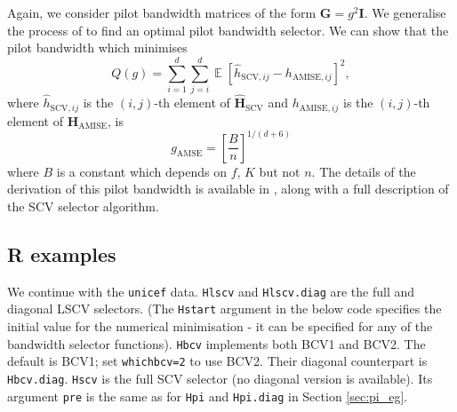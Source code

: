 \documentclass[a4paper,11pt]{article}
\newcommand{\mat}[1]{\mathbf{#1}}
\def\Hmat{\mat{H}}
\def\G{\mat{G}}
\def\AMSE{\mathrm{AMSE}}
\def\AMISE{\mathrm{AMISE}}
\def\SCV{\mathrm{SCV}}
\DeclareMathOperator{\E}{\boldsymbol{\mathbb{E}}}
\begin{document}
Again, we consider pilot bandwidth matrices of the form  $\G = g^2 \mat{I}$.
We generalise the process of \citet*{jones1991b} to find an optimal 
pilot bandwidth selector.
We can show that the pilot bandwidth which minimises 
$$Q(g) = \sum_{i=1}^d \sum_{j=i}^d \E [\hat{h}_{\SCV,ij} - h_{\AMISE,ij}]^2,$$
where $\hat{h}_{\SCV,ij}$ is the $(i,j)$-th element of $\hat{\Hmat}_\SCV$
and $h_{\AMISE,ij}$ is the $(i,j)$-th element of $\Hmat_\AMISE$, is
\begin{equation}
g_\AMSE = \left[ \frac{B}{n}\right] ^{1/(d+6)}
\label{eq:gamse}
\end{equation}
where $B$ is a constant which depends on $f$, $K$ but not $n$.  
The details of the derivation
of this pilot bandwidth is available in \citet*{duong2005},
along with a full description of the SCV selector algorithm.


\subsection{R examples}
\label{sec:cv_eg}

We continue with the \texttt{unicef} data. 
\texttt{Hlscv} and \texttt{Hlscv.diag} are the full and diagonal
LSCV selectors. (The \texttt{Hstart} argument in the below code specifies the initial
value for the numerical minimisation - it can be specified
for any of the bandwidth selector functions). 
\texttt{Hbcv} implements both BCV1 and BCV2. The
default is BCV1; set \texttt{whichbcv=2} to use BCV2.
Their diagonal counterpart is \texttt{Hbcv.diag}. 
\texttt{Hscv} is the full SCV selector (no diagonal version is available).
Its argument \texttt{pre} is the same as for \texttt{Hpi} and \texttt{Hpi.diag}
in Section \ref{sec:pi_eg}.  
\end{document}
